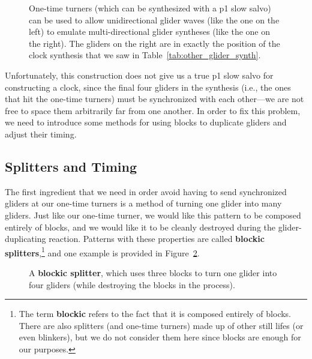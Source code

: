 \begin{figure}[!htb]
	\centering{}
	\caption{One-time turners (which can be synthesized with a p1 slow salvo) can be used to allow unidirectional glider waves (like the one on the left) to emulate multi-directional glider syntheses (like the one on the right). The gliders on the right are in exactly the position of the clock synthesis that we saw in Table~\ref{tab:other_glider_synth}.}\label{fig:unidirection_clock_synthesis}
\end{figure}

Unfortunately, this construction does not give us a true p1 slow salvo for constructing a clock, since the final four gliders in the synthesis (i.e., the ones that hit the one-time turners) must be synchronized with each other---we are not free to space them arbitrarily far from one another. In order to fix this problem, we need to introduce some methods for using blocks to duplicate gliders and adjust their timing.


\subsection{Splitters and Timing}\label{sec:slow_salvo_splitters}

The first ingredient that we need in order avoid having to send synchronized gliders at our one-time turners is a method of turning one glider into many gliders. Just like our one-time turner, we would like this pattern to be composed entirely of blocks, and we would like it to be cleanly destroyed during the glider-duplicating reaction. Patterns with these properties are called \textbf{blockic splitters},\footnote{The term \textbf{blockic} refers to the fact that it is composed entirely of blocks. There are also splitters (and one-time turners) made up of other still lifes (or even blinkers), but we do not consider them here since blocks are enough for our purposes.} and one example is provided in Figure~\ref{fig:one_time_splitter}.

\begin{figure}[!htb]
	\centering{}
	\caption{A \textbf{blockic splitter}, which uses three blocks to turn one glider into four gliders (while destroying the blocks in the process).}\label{fig:one_time_splitter}
\end{figure}


